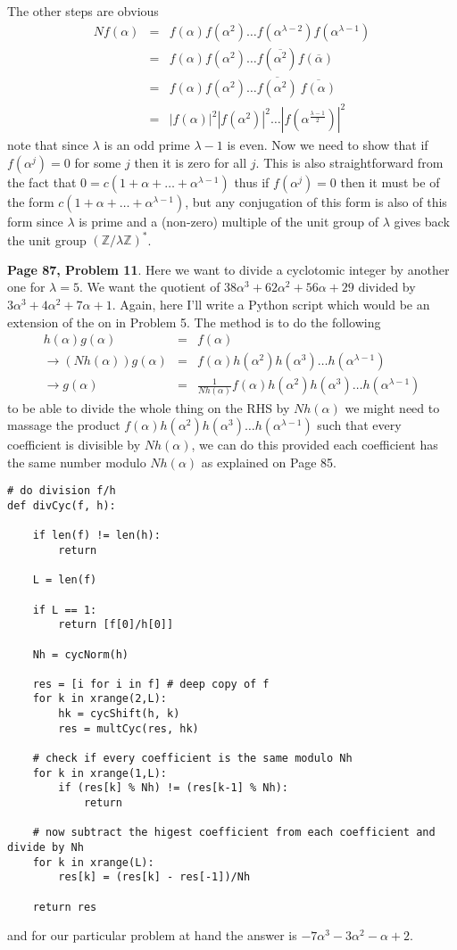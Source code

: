 \documentclass[aps,preprint,preprintnumbers,nofootinbib,showpacs,prd]{revtex4-1}
\newcommand{\nbea}{\begin{eqnarray*}}
\newcommand{\neea}{\end{eqnarray*}}
\begin{document}
The other steps are obvious
%
\nbea
Nf(\alpha) & = & f(\alpha) f(\alpha^2) \dots f(\alpha^{\lambda-2})f(\alpha^{\lambda-1}) \\
& = & f(\alpha) f(\alpha^2) \dots f(\overline{\alpha^2})f(\overline{\alpha}) \\
& = & f(\alpha) f(\alpha^2) \dots \overline{f(\alpha^2)}~\overline{f(\alpha)} \\
& = & |f(\alpha)|^2 |f(\alpha^2)|^2 \dots |f(\alpha^{\frac{\lambda-1}{2}})|^2
\neea
%
note that since $\lambda$ is an odd prime $\lambda-1$ is even. Now we need to show that if $f(\alpha^j) = 0$ for some $j$ then it is zero for all $j$. This is also straightforward from the fact that $0 = c(1 + \alpha + \dots + \alpha^{\lambda-1})$ thus if $f(\alpha^j) = 0$ then it must be of the form $c(1 + \alpha + \dots + \alpha^{\lambda-1})$, but any conjugation of this form is also of this form since $\lambda$ is prime and a (non-zero) multiple of the unit group of $\lambda$ gives back the unit group $(\mathbb{Z}/\lambda\mathbb{Z})^*$.

{\bf Page 87, Problem 11}. Here we want to divide a cyclotomic integer by another one for $\lambda = 5$. We want the quotient of $38\alpha^3 + 62\alpha^2 + 56\alpha + 29$ divided by $3\alpha^3 + 4\alpha^2 + 7\alpha + 1$. Again, here I'll write a Python script which would be an extension of the on in Problem 5. The method is to do the following
%
\nbea
h(\alpha) g(\alpha) & = & f(\alpha) \\
\to (Nh(\alpha)) g(\alpha) & = & f(\alpha) h(\alpha^2) h(\alpha^3) \dots h(\alpha^{\lambda-1}) \\
\to g(\alpha) & = & \frac{1}{Nh(\alpha)} f(\alpha) h(\alpha^2) h(\alpha^3) \dots h(\alpha^{\lambda-1})
\neea
%
to be able to divide the whole thing on the RHS by $Nh(\alpha)$ we might need to massage the product $f(\alpha) h(\alpha^2) h(\alpha^3) \dots h(\alpha^{\lambda-1})$ such that every coefficient is divisible by $Nh(\alpha)$, we can do this provided each coefficient has the same number modulo $Nh(\alpha)$ as explained on Page 85.
%
\begin{Verbatim}[baselinestretch=0.75]
# do division f/h
def divCyc(f, h):

    if len(f) != len(h):
        return

    L = len(f)

    if L == 1:
        return [f[0]/h[0]]

    Nh = cycNorm(h)

    res = [i for i in f] # deep copy of f
    for k in xrange(2,L):
        hk = cycShift(h, k)
        res = multCyc(res, hk)

    # check if every coefficient is the same modulo Nh
    for k in xrange(1,L):
        if (res[k] % Nh) != (res[k-1] % Nh):
            return

    # now subtract the higest coefficient from each coefficient and divide by Nh
    for k in xrange(L):
        res[k] = (res[k] - res[-1])/Nh

    return res
\end{Verbatim}
%
and for our particular problem at hand the answer is $-7\alpha^3 - 3\alpha^2 - \alpha + 2$.
\end{document}
